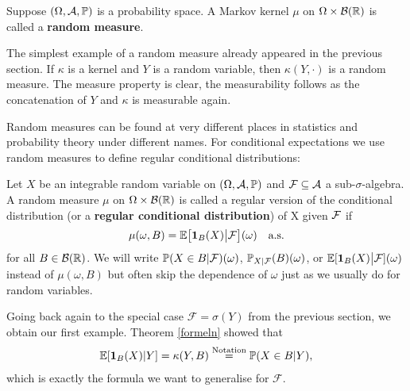 \begin{ldef}
\begin{deff}
	Suppose $(\Omega, \mathcal A, \P)$ is a probability space. A Markov kernel $\mu$ on $\Omega\times \mathcal B(\R)$ is called a \textbf{random measure}.
\end{deff}
\end{ldef}
The simplest example of a random measure already appeared in the previous section. If $\kappa$ is a kernel and $Y$ is a random variable, then $\kappa(Y,\cdot)$ is a random measure. The measure property is clear, the measurability follows as the concatenation of $Y$ and $\kappa$ is measurable again.\smallskip

Random measures can be found at very different places in statistics and probability theory under different names. For conditional expectations we use random measures to define regular conditional distributions:
\begin{ldef}
\begin{deff}\label{def_regular_cond_expectation}
Let $X$ be an integrable random variable on $(\Omega,\cA,\mathbb{P})$ and $\cF \subseteq \cA$ a sub-$\sigma$-algebra. A random measure $\mu$ on $\Omega\times \cB(\mathbb{R})$ is called a regular version of the conditional distribution (or a \textbf{regular conditional distribution}) of X given {$\cF$} if \[ \mu(\omega,B)=\mathbb{E}\big[\mathbf 1_B(X)\big|  \cF\big](\omega)\quad \text{a.s.} \]
		for all $B \in \cB(\mathbb{R})$. We will write $\P(X\in B|\mathcal F)(\omega)$, $\P_{X|\mathcal F}(B)(\omega)$, or $\mathbb{E}[\mathbf 1_B(X)\big|  \cF](\omega)$ instead of $\mu(\omega,B)$ but often skip the dependence of $\omega$ just as we usually do for random variables.
\end{deff}
\end{ldef}
Going back again to the special case $\mathcal F=\sigma(Y)$ from the previous section, we obtain our first example. Theorem \ref{formeln} showed that 
\begin{align*}
	\E[\mathbf 1_B(X)|Y]=\kappa(Y,B)\overset{\text{Notation}}=\P(X\in  B|Y),
\end{align*}
which is exactly the formula we want to generalise for $\mathcal F$.\smallskip

